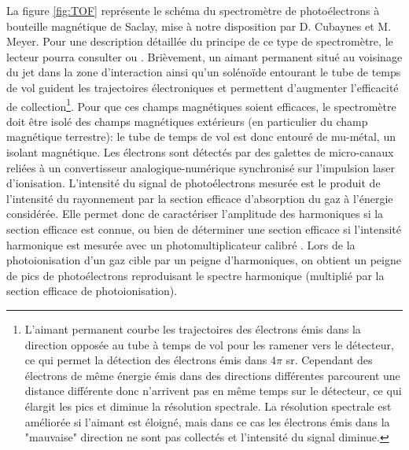 La figure \ref{fig:TOF} représente le schéma du spectromètre de photoélectrons à bouteille magnétique de Saclay, mise à notre disposition par D. Cubaynes et M. Meyer. Pour une description détaillée du principe de ce type de spectromètre, le lecteur pourra consulter  ou . Brièvement, un aimant permanent situé au voisinage du jet dans la zone d'interaction ainsi qu'un solénoïde entourant le tube de temps de vol guident les trajectoires électroniques et permettent d'augmenter l'efficacité de collection\footnote{L'aimant permanent courbe les trajectoires des électrons émis dans la direction opposée au tube à temps de vol pour les ramener vers le détecteur, ce qui permet la détection des électrons émis dans $4 \pi$ sr. Cependant des électrons de même énergie émis dans des directions différentes parcourent une distance différente donc n'arrivent pas en même temps sur le détecteur, ce qui élargit les pics et diminue la résolution spectrale. La résolution spectrale est améliorée si l'aimant est éloigné, mais dans ce cas les électrons émis dans la "mauvaise" direction ne sont pas collectés et l'intensité du signal diminue.}. Pour que ces champs magnétiques soient efficaces, le spectromètre doit être isolé des champs magnétiques extérieurs (en particulier du champ magnétique terrestre): le tube de temps de vol est donc entouré de mu-métal, un isolant magnétique. Les électrons sont détectés par des galettes de micro-canaux reliées à un convertisseur analogique-numérique synchronisé sur l'impulsion laser d'ionisation. L'intensité du signal de photoélectrons mesurée est le produit de l'intensité du rayonnement par la section efficace d'absorption du gaz à l'énergie considérée. Elle permet donc de caractériser l'amplitude des harmoniques si la section efficace est connue, ou bien de déterminer une section efficace si l'intensité harmonique est mesurée avec un photomultiplicateur calibré . Lors de la photoionisation d'un gaz cible par un peigne d'harmoniques, on obtient un peigne de pics de photoélectrons reproduisant le spectre harmonique (multiplié par la section efficace de photoionisation).

